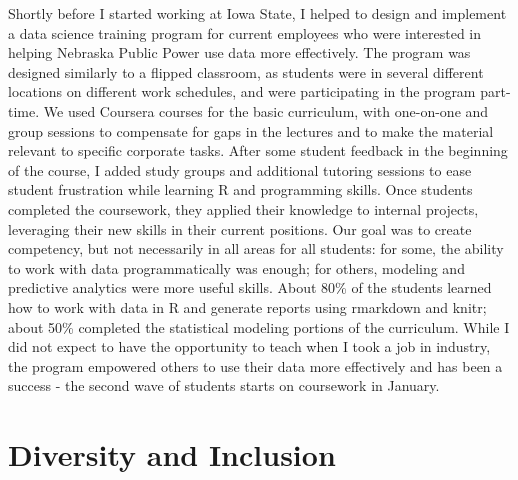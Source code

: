 \documentclass[12pt, letterpaper, sans]{moderncv}
\begin{document}
Shortly before I started working at Iowa State, I helped to design and implement a data science training program for current employees who were interested in helping Nebraska Public Power use data more effectively. The program was designed similarly to a flipped classroom, as students were in several different locations on different work schedules, and were participating in the program part-time. We used Coursera courses for the basic curriculum, with one-on-one and group sessions to compensate for gaps in the lectures and to make the material relevant to specific corporate tasks. After some student feedback in the beginning of the course, I added study groups and additional tutoring sessions to ease student frustration while learning R and programming skills. Once students completed the coursework, they applied their knowledge to internal projects, leveraging their new skills in their current positions. Our goal was to create competency, but not necessarily in all areas for all students: for some, the ability to work with data programmatically was enough; for others, modeling and predictive analytics were more useful skills. About 80\% of the students learned how to work with data in R and generate reports using rmarkdown and knitr; about 50\% completed the statistical modeling portions of the curriculum. While I did not expect to have the opportunity to teach when I took a job in industry, the program empowered others to use their data more effectively and has been a success - the second wave of students starts on coursework in January. 

\clearpage
\section{Diversity and Inclusion}

\end{document}
